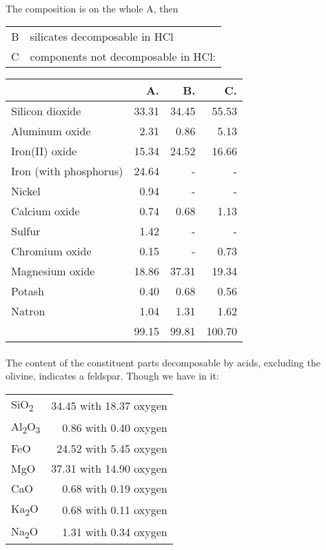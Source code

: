 \documentclass[a4paper, 12pt, oneside]{article}
\begin{document}
\paragraph{}
The composition is on the whole A, then  
\begin{center}
    \begin{tabular}{r l}
        B & silicates decomposable in HCl\\
        C & components not decomposable in HCl:\\
    \end{tabular}
\end{center}
\begin{center}
    \begin{tabular}{ |l|r|r|r| }
        \hline
         & A. & B. & C.\\\hline
        Silicon dioxide & 33.31 & 34.45 & 55.53\\\hline
        Aluminum oxide & 2.31 & 0.86 & 5.13\\\hline
        Iron(II) oxide & 15.34 & 24.52 & 16.66\\\hline
        Iron (with phosphorus) & 24.64 & - & -\\\hline
        Nickel & 0.94 & - & -\\\hline
        Calcium oxide & 0.74 & 0.68 & 1.13\\\hline
        Sulfur & 1.42 & - & -\\\hline
        Chromium oxide & 0.15 & - & 0.73\\\hline
        Magnesium oxide & 18.86 & 37.31 & 19.34\\\hline
        Potash & 0.40 & 0.68 & 0.56\\\hline
        Natron & 1.04 & 1.31 & 1.62\\\hline
         & 99.15 & 99.81 & 100.70\\
        \hline
    \end{tabular}
\end{center}
\paragraph{}
The content of the constituent parts decomposable by acids, excluding the olivine, indicates a feldspar. Though we have in it:
\begin{center}
    \begin{tabular}{l r}
        SiO\textsubscript{2} & 34.45 with 18.37 oxygen\\
        Al\textsubscript{2}O\textsubscript{3} & 0.86 with 0.40 oxygen\\
        FeO & 24.52 with 5.45 oxygen\\
        MgO & 37.31 with 14.90 oxygen\\
        CaO & 0.68 with 0.19 oxygen\\
        Ka\textsubscript{2}O & 0.68 with 0.11 oxygen\\
        Na\textsubscript{2}O & 1.31 with 0.34 oxygen\\
    \end{tabular}
\end{center}
\end{document}
